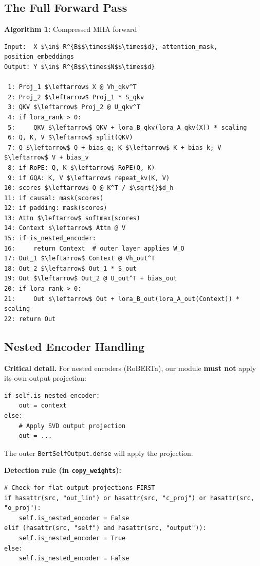 \subsection{The Full Forward Pass}

\textbf{Algorithm 1:} Compressed MHA forward
\begin{lstlisting}
Input:  X $\in$ R^{B$$\times$N$$\times$d}, attention_mask, position_embeddings
Output: Y $\in$ R^{B$$\times$N$$\times$d}

 1: Proj_1 $\leftarrow$ X @ Vh_qkv^T
 2: Proj_2 $\leftarrow$ Proj_1 * S_qkv
 3: QKV $\leftarrow$ Proj_2 @ U_qkv^T
 4: if lora_rank > 0:
 5:     QKV $\leftarrow$ QKV + lora_B_qkv(lora_A_qkv(X)) * scaling
 6: Q, K, V $\leftarrow$ split(QKV)
 7: Q $\leftarrow$ Q + bias_q; K $\leftarrow$ K + bias_k; V $\leftarrow$ V + bias_v
 8: if RoPE: Q, K $\leftarrow$ RoPE(Q, K)
 9: if GQA: K, V $\leftarrow$ repeat_kv(K, V)
10: scores $\leftarrow$ Q @ K^T / $\sqrt{}$d_h
11: if causal: mask(scores)
12: if padding: mask(scores)
13: Attn $\leftarrow$ softmax(scores)
14: Context $\leftarrow$ Attn @ V
15: if is_nested_encoder:
16:     return Context  # outer layer applies W_O
17: Out_1 $\leftarrow$ Context @ Vh_out^T
18: Out_2 $\leftarrow$ Out_1 * S_out
19: Out $\leftarrow$ Out_2 @ U_out^T + bias_out
20: if lora_rank > 0:
21:     Out $\leftarrow$ Out + lora_B_out(lora_A_out(Context)) * scaling
22: return Out
\end{lstlisting}

\subsection{Nested Encoder Handling}

\textbf{Critical detail.} For nested encoders (RoBERTa), our module \textbf{must not} 
apply its own output projection:

\begin{lstlisting}
if self.is_nested_encoder:
    out = context
else:
    # Apply SVD output projection
    out = ...
\end{lstlisting}

The outer \texttt{BertSelfOutput.dense} will apply the projection.

\textbf{Detection rule (in \texttt{copy\_weights}):}

\begin{lstlisting}
# Check for flat output projections FIRST
if hasattr(src, "out_lin") or hasattr(src, "c_proj") or hasattr(src, "o_proj"):
    self.is_nested_encoder = False
elif (hasattr(src, "self") and hasattr(src, "output")):
    self.is_nested_encoder = True
else:
    self.is_nested_encoder = False
\end{lstlisting}


